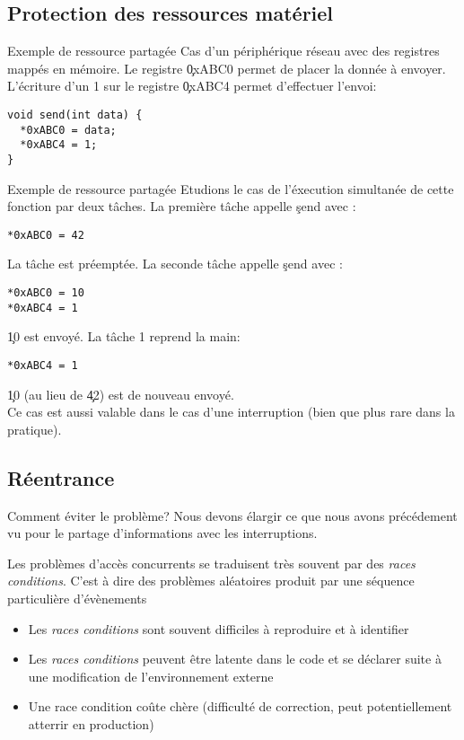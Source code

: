 \subsection{Protection des ressources matériel}

\begin{frame}[fragile]{Exemple de ressource partagée}
  Cas d'un  périphérique réseau avec des registres  mappés en mémoire.
  Le  registre  \c{0xABC0}  permet  de  placer la  donnée  à  envoyer.
  L'écriture  d'un 1  sur  le registre  \c{0xABC4} permet  d'effectuer
  l'envoi:
\begin{lstlisting} 
void send(int data) {
  *0xABC0 = data;
  *0xABC4 = 1;
}
  \end{lstlisting} 
\end{frame} 

\begin{frame}[fragile]{Exemple de ressource partagée}
  Etudions le cas de l'éxecution simultanée de cette fonction par deux
  tâches.  La première tâche appelle \c{send} avec :
  \begin{lstlisting} 
*0xABC0 = 42
  \end{lstlisting} 
  La  tâche est  préemptée.  La  seconde tâche  appelle  \c{send} avec
  :
\begin{lstlisting} 
*0xABC0 = 10
*0xABC4 = 1
\end{lstlisting} 
  \c{10} est envoyé. La tâche 1 reprend la main:
\begin{lstlisting} 
*0xABC4 = 1
\end{lstlisting} 
  \c{10} (au lieu de \c{42}) est de nouveau envoyé.\\[3mm]

  Ce cas  est aussi valable dans  le cas d'une  interruption (bien que
  plus rare dans la pratique).
\end{frame} 

\subsection{Réentrance}

\begin{frame}{Comment éviter le problème?}
  Nous devons élargir ce que nous avons précédement vu pour le partage
  d'informations avec les interruptions.

  Les problèmes d'accès concurrents se traduisent très souvent par des
  \emph{races  conditions}.   C'est à  dire  des problèmes  aléatoires
  produit par une séquence particulière d'évènements
  \begin{itemize} 
  \item   Les  \emph{races  conditions}   sont  souvent   difficiles  à
    reproduire et à identifier
  \item Les  \emph{races conditions} peuvent être latente  dans le code
    et se déclarer suite à une modification de l'environnement externe
  \item Une race condition coûte chère (difficulté de correction, peut
    potentiellement atterrir en production)
  \end{itemize} 
\end{frame}

